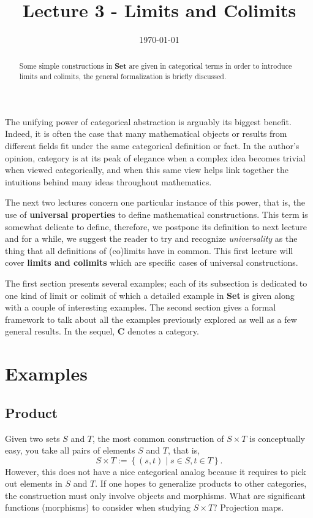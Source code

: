 \documentclass{article}
\title{Lecture 3 - Limits and Colimits\vspace{-10pt}}
\date{\vspace{-30pt}\today\vspace{-15pt}}  %
\theoremstyle{definition}
\theoremstyle{remark}
\begin{document}
\maketitle
\begin{abstract} Some simple constructions in \textbf{Set} are given in categorical terms in order to introduce limits and colimits, the general formalization is briefly discussed.
\end{abstract}
The unifying power of categorical abstraction is arguably its biggest benefit. Indeed, it is often the case that many mathematical objects or results from different fields fit under the same categorical definition or fact. In the author's opinion, category is at its peak of elegance when a complex idea becomes trivial when viewed categorically, and when this same view helps link together the intuitions behind many ideas throughout mathematics. 

The next two lectures concern one particular instance of this power, that is, the use of \textbf{universal properties} to define mathematical constructions. This term is somewhat delicate to define, therefore, we postpone its definition to next lecture and for a while, we suggest the reader to try and recognize \textit{universality} as the thing that all definitions of (co)limits have in common. This first lecture will cover \textbf{limits and colimits} which are specific cases of universal constructions.

The first section presents several examples; each of its subsection is dedicated to one kind of limit or colimit of which a detailed example in \textbf{Set} is given along with a couple of interesting examples. The second section gives a formal framework to talk about all the examples previously explored as well as a few general results. In the sequel, $\mathbf{C}$ denotes a category.

\section{Examples}
\subsection{Product}
Given two sets $S$ and $T$, the most common construction of $S \times T$ is conceptually easy, you take all pairs of elements $S$ and $T$, that is,
\[S\times T := \left\{ (s,t) \mid s \in S, t \in T\right\}.\]
However, this does not have a nice categorical analog because it requires to pick out elements in $S$ and $T$. If one hopes to generalize products to other categories, the construction must only involve objects and morphisms. What are significant functions (morphisms) to consider when studying $S \times T$? Projection maps.
\end{document}
